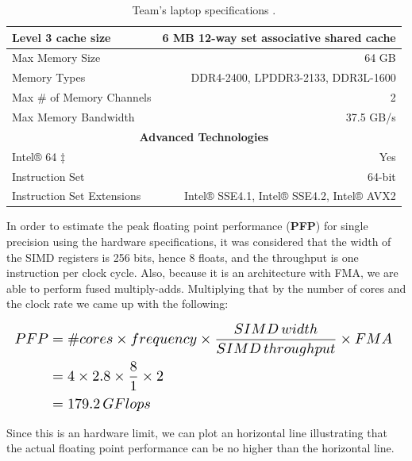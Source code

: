\documentclass[twoside,twocolumn]{article}
\begin{document}
\begin{table}[ht]
{\begin{tabular}{|l|r|}
Level 3 cache size                  & 6 MB 12-way set associative shared cache           \\ \hline
Max Memory Size                     & 64 GB                                              \\ \hline
Memory Types                        & DDR4-2400, LPDDR3-2133, DDR3L-1600                 \\ \hline
Max \# of Memory Channels           & 2                                                  \\ \hline
Max Memory Bandwidth                & 37.5 GB/s                                          \\ \hline
\multicolumn{2}{|c|}{\textbf{Advanced Technologies}}                                     \\ \hline
Intel® 64 ‡                         & Yes                                                \\ \hline
Instruction Set                     & 64-bit                                             \\ \hline
Instruction Set Extensions          & Intel® SSE4.1, Intel® SSE4.2, Intel® AVX2          \\ \hline
\end{tabular}
}
\caption{Team's laptop specifications \cite{cpuworld_laptopspecs} \cite{intel_laptopspecs}.}
\label{tab:laptopspecs}
\end{table}

In order to estimate the peak floating point performance (\textbf{PFP}) for single precision using the hardware specifications, it was considered that the width of the SIMD registers is 256 bits, hence 8 floats, and the throughput is one instruction per clock cycle. Also, because it is an architecture with FMA, we are able to perform fused multiply-adds. Multiplying that by the number of cores and the clock rate we came up with the following:

\begin{equation} \label{eq:pfplaptop}
\resizebox{\columnwidth}{!}{%
$\begin{aligned}
PFP & = \#cores \times frequency \times \frac{SIMD \thinspace width}{SIMD \thinspace throughput} \times FMA \\
    & = 4 \times 2.8 \times \frac{8}{1} \times 2 \\
    & = 179.2 \thinspace GFlops
\end{aligned}$
}
\end{equation}

Since this is an hardware limit, we can plot an horizontal line illustrating that the actual floating point performance can be no higher than the horizontal line.
\end{document}
